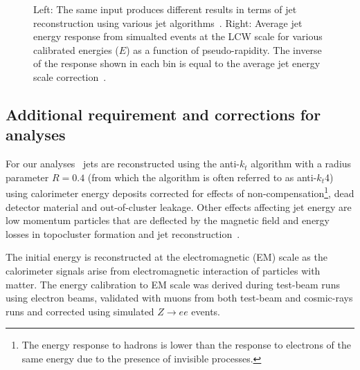 \begin{figure}[tb]\begin{center}
        \caption{Left: The same input produces different results in terms of jet reconstruction using 
        various jet algorithms~\cite{Salam:2009jx}. Right: Average jet energy response from simualted events
        at the LCW scale for various calibrated energies ($E$) as a function of
        pseudo-rapidity. The inverse of the response shown 
        in each bin is equal to the average jet energy scale correction~\cite{jes}.}
\end{center}\end{figure}


\subsection{Additional requirement and corrections for analyses}

For our analyses~\cite{topcommon2013} jets are reconstructed using the anti-$k_t$
algorithm with a radius parameter $R=0.4$ (from which the algorithm is often referred to as anti-$k_t$4) 
using calorimeter energy deposits corrected for effects of non-compensation\footnote{The energy response 
to hadrons is lower than the response to electrons of the same energy due to the presence of invisible processes.},
dead detector material and out-of-cluster leakage.
Other effects affecting jet energy are low momentum particles
that are deflected by the magnetic field and energy losses in 
topocluster formation and jet reconstruction~\cite{jes}. 

The initial energy is reconstructed at the electromagnetic (EM) scale as
the calorimeter signals arise from electromagnetic interaction of
particles with matter. The energy calibration to EM scale was derived
during test-beam runs using electron beams, validated with muons
from both test-beam and cosmic-rays runs and corrected using simulated $Z\to ee$ events.

